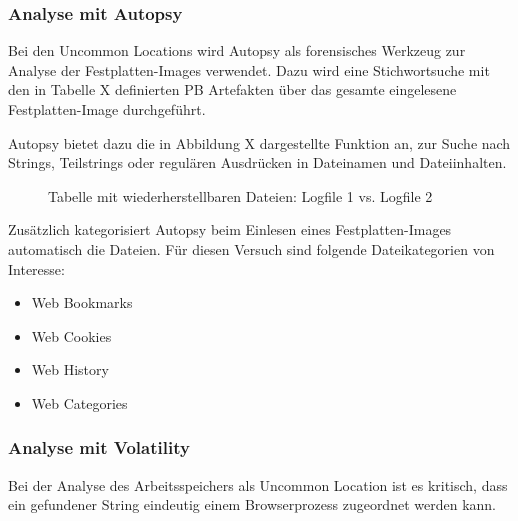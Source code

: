 \subsubsection*{Analyse mit Autopsy}
Bei den Uncommon Locations wird Autopsy als forensisches Werkzeug zur Analyse der Festplatten-Images verwendet.
Dazu wird eine Stichwortsuche mit den in Tabelle X definierten PB Artefakten über das gesamte eingelesene Festplatten-Image durchgeführt.

Autopsy bietet dazu die in Abbildung X dargestellte Funktion an, zur Suche nach Strings, Teilstrings oder regulären Ausdrücken in Dateinamen und Dateiinhalten.
\begin{figure}[h!]
	\caption{Tabelle mit wiederherstellbaren Dateien: Logfile 1 vs. Logfile 2}
\end{figure}

Zusätzlich kategorisiert Autopsy beim Einlesen eines Festplatten-Images automatisch die Dateien. Für diesen Versuch sind folgende Dateikategorien von Interesse:
\begin{itemize}
\item Web Bookmarks
\item Web Cookies
\item Web History
\item Web Categories
\end{itemize}


\subsubsection*{Analyse mit Volatility}
Bei der Analyse des Arbeitsspeichers als Uncommon Location ist es kritisch, dass ein gefundener String eindeutig einem Browserprozess zugeordnet werden kann. 

